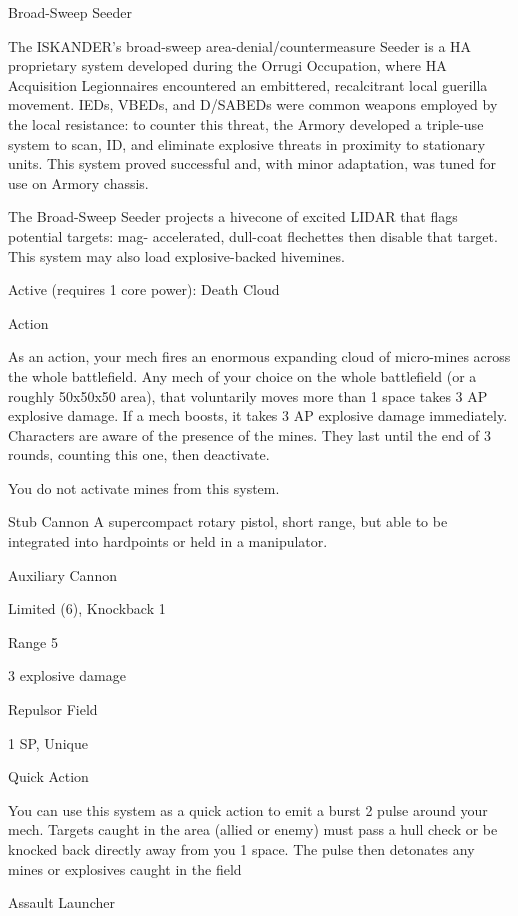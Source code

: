                                              Broad-Sweep Seeder  

 The ISKANDER’s broad-sweep area-denial/countermeasure Seeder is a HA proprietary system  
 developed during the Orrugi Occupation, where HA Acquisition Legionnaires encountered an  
 embittered, recalcitrant local guerilla movement. IEDs, VBEDs, and D/SABEDs were common weapons  
 employed by the local resistance: to counter this threat, the Armory developed a triple-use system to  
 scan, ID, and eliminate explosive threats in proximity to stationary units. This system proved successful  
 and, with minor adaptation, was tuned for use on Armory chassis.   

 The Broad-Sweep Seeder projects a hivecone of excited LIDAR that flags potential targets: mag- 
 accelerated, dull-coat flechettes then disable that target. This system may also load explosive-backed  
 hivemines.   

 Active (requires 1 core power): Death Cloud
 
 Action
 
 As an action, your mech fires an enormous expanding cloud of micro-mines across the whole  
 battlefield. Any mech of your choice on the whole battlefield (or a roughly 50x50x50 area), that  
 voluntarily moves more than 1 space takes 3 AP explosive damage. If a mech boosts, it takes 3 AP  
 explosive damage immediately. Characters are aware of the presence of the mines. They last until the  
 end of 3 rounds, counting this one, then deactivate.
 
 You do not activate mines from this system. 

Stub Cannon  
A supercompact rotary pistol, short range, but able to be integrated into hardpoints or held in a  
manipulator.  

Auxiliary Cannon
 
Limited (6), Knockback 1
 
Range 5
 
3 explosive damage  

Repulsor Field
 

1 SP, Unique
 

Quick Action
 
You can use this system as a quick action to emit a burst 2 pulse around your mech. Targets  
caught in the area (allied or enemy) must pass a hull check or be knocked back directly away  
from you 1 space. The pulse then detonates any mines or explosives caught in the field
 

Assault Launcher  

